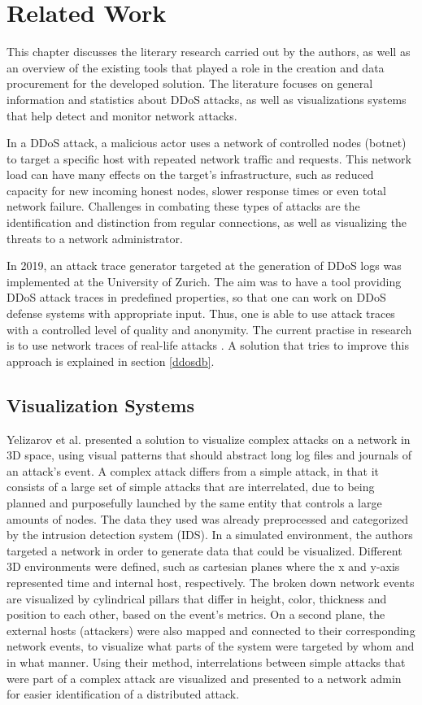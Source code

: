 \chapter{Related Work}
This chapter discusses the literary research carried out by the authors, as well as an overview of the existing tools that played a role in the creation and data procurement for the developed solution. The literature focuses on general information and statistics about DDoS attacks, as well as visualizations systems that help detect and monitor network attacks.

In a DDoS attack, a malicious actor uses a network of controlled nodes (botnet) to target a specific host with repeated network traffic and requests. This network load can have many effects on the target's infrastructure, such as reduced capacity for new incoming honest nodes, slower response times or even total network failure. Challenges in combating these types of attacks are the identification and distinction from regular connections, as well as visualizing the threats to a network administrator.

In 2019, an attack trace generator targeted at the generation of DDoS logs was implemented at the University of Zurich. The aim was to have a tool providing DDoS attack traces in predefined properties, so that one can work on DDoS defense systems with appropriate input. Thus, one is able to use attack traces with a controlled level of quality and anonymity. The current practise in research is to use network traces of real-life attacks \cite{ddoslogsim}. A solution that tries to improve this approach is explained in section \ref{ddosdb}.

\section{Visualization Systems}
Yelizarov et al. \cite{yelizarov} presented a solution to visualize complex attacks on a network in 3D space, using visual patterns that should abstract long log files and journals of an attack's event. A complex attack differs from a simple attack, in that it consists of a large set of simple attacks that are interrelated, due to being planned and purposefully launched by the same entity that controls a large amounts of nodes. The data they used was already preprocessed and categorized by the intrusion detection system (IDS). In a simulated environment, the authors targeted a network in order to generate data that could be visualized. Different 3D environments were defined, such as cartesian planes where the x and y-axis represented time and internal host, respectively. The broken down network events are visualized by cylindrical pillars that differ in height, color, thickness and position to each other, based on the event's metrics. On a second plane, the external hosts (attackers) were also mapped and connected to their corresponding network events, to visualize what parts of the system were targeted by whom and in what manner. Using their method, interrelations between simple attacks that were part of a complex attack are visualized and presented to a network admin for easier identification of a distributed attack.

